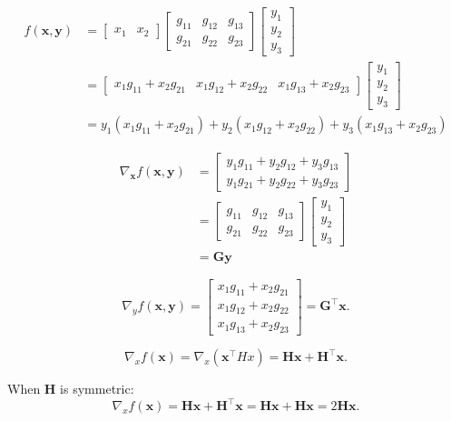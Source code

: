\begin{align*}
  f(\mathbf{x, y}) & =
  \begin{bmatrix}x_1 & x_2\end{bmatrix}
  \begin{bmatrix}
    g_{11} & g_{12} & g_{13} \\ g_{21} & g_{22} & g_{23}
  \end{bmatrix}
  \begin{bmatrix}
    y_1 \\ y_2 \\ y_3
  \end{bmatrix}
  \\ &=
  \begin{bmatrix}
    x_1g_{11} + x_2g_{21} & x_1 g_{12} + x_2 g_{22} & x_1g_{13} + x_2 g_{23}
  \end{bmatrix}
  \begin{bmatrix}
    y_1 \\ y_2 \\ y_3
  \end{bmatrix}
  \\ &=
  y_1(x_1g_{11}+x_2g_{21}) + y_2(x_1g_{12} + x_2 g_{22}) + y_3(x_1g_{13}+x_2g_{23})
\end{align*}

\begin{align*}
  \nabla _{\mathbf{x}} f(\mathbf{x,y}) & =
  \begin{bmatrix}
    y_1g_{11}+ y_2g_{12} + y_3 g_{13} \\ y_1g_{21} + y_2 g_{22} + y_3 g_{23}
  \end{bmatrix}
  \\ &=
  \begin{bmatrix}
    g_{11} & g_{12} & g_{13} \\ g_{21} & g_{22} & g_{23}
  \end{bmatrix}
  \begin{bmatrix}
    y_1 \\ y_2 \\ y_3
  \end{bmatrix}
  \\ &= \mathbf{Gy}
\end{align*}


\[
  \nabla_y f(\mathbf{x, y}) = \begin{bmatrix}
    x_1g_{11} + x_2g_{21} \\ x_1g_{12} + x_2g_{22} \\ x_1g_{13} + x_2g_{23}
  \end{bmatrix}
  = \mathbf{G^{\top}x}
.\] 


\[
  \nabla _x f(\mathbf{x}) = \nabla _x(\mathbf{x}^{\top}Hx) = \mathbf{Hx} + \mathbf{H^{\top}x}
.\] 

When $\mathbf{H}$ is symmetric: 
\[
  \nabla _x f(\mathbf{x}) = \mathbf{Hx} + \mathbf{H^{\top}x} = \mathbf{Hx} + \mathbf{Hx} = 2\mathbf{Hx}
.\] 